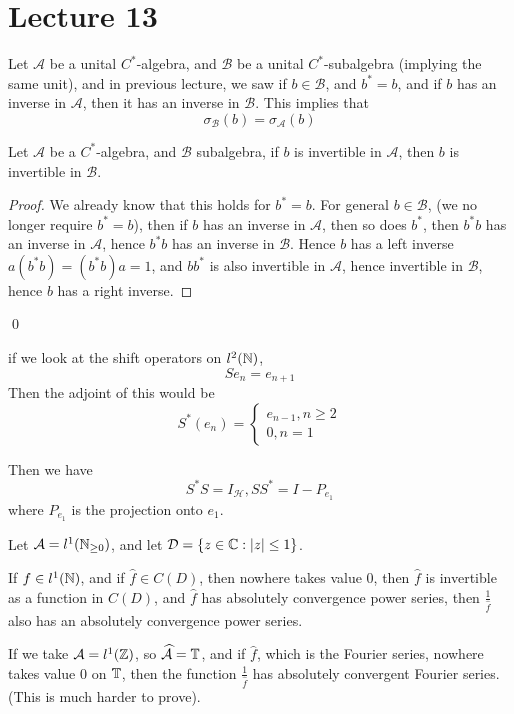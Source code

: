 \section{Lecture 13}
Let $\mathcal{A}$ be a unital $C^*$-algebra, and $\mathcal{B}$ be a unital $C^*$-subalgebra (implying the same unit), and in previous lecture, we saw if $b\in\mathcal{B}$, and $b^*=b$, and if $b$ has an inverse in $\mathcal{A}$, then it has an inverse in $\mathcal{B}$. 
This implies that
\begin{equation*}
    \sigma_\mathcal{B}(b)=\sigma_\mathcal{A}(b)
\end{equation*}



\begin{proposition}
    Let $\mathcal{A}$ be a $C^*$-algebra, and $\mathcal{B}$ subalgebra, if $b$ is invertible in $\mathcal{A}$, then $b$ is invertible in $\mathcal{B}$.
\end{proposition}
\begin{proof}
    We already know that this holds for $b^*=b$. For general $b\in\mathcal{B}$, (we no longer require $b^*=b$), then if $b$ has an inverse in $\mathcal{A}$, then so does $b^*$, then $b^*b$ has an inverse in $\mathcal{A}$, hence $b^*b$ has an inverse in $\mathcal{B}$. Hence $b$ has a left inverse $a(b^*b)=(b^*b)a=1$, and $bb^*$ is also invertible in $\mathcal{A}$, hence invertible in $\mathcal{B}$, hence $b$ has a right inverse.
\end{proof}
\qed

if we look at the shift operators on $l^2(\mathbb{N})$, 
\begin{equation}
    Se_n=e_{n+1}
\end{equation}
Then the adjoint of this would be
\begin{equation*}
    S^*(e_n)=\begin{cases}
        e_{n-1}, n\geq 2\\
        0, n=1
    \end{cases}
\end{equation*}

Then we have
\begin{equation*}
    S^*S=I_\mathcal{H}, SS^*=I-P_{e_1}
\end{equation*}
where $P_{e_1}$ is the projection onto $e_1$.

Let $\mathcal{A}=l^1(\mathbb{N}_{\geq 0})$, and let $\mathcal{D}=\{z\in\mathbb{C}: |z|\leq 1\}$.
\begin{theorem}
    If $f\in l^1(\mathbb{N})$, and if $\hat{f}\in C(D)$, then nowhere takes value 0, then $\hat{f}$ is invertible as a function in $C(D)$, and $\hat{f}$ has absolutely convergence power series, then $\frac{1}{\hat{f}}$ also has an absolutely convergence power series.
\end{theorem}
\begin{note}
    If we take $\mathcal{A}=l^1(\mathbb{Z})$, so $\widehat{\mathcal{A}}=\mathbb{T}$, and if $\hat{f}$, which is the Fourier series, nowhere takes value 0 on $\mathbb{T}$, then the function $\frac{1}{\hat{f}}$ has absolutely convergent Fourier series. (This is much harder to prove).
\end{note}

